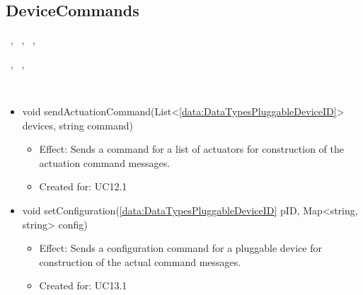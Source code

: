   \subsection{DeviceCommands}\label{int:OnlineServiceOnlineServiceApplicationManagerApplicationManagementLogicDeviceCommands}
    \begin{description}
      \item[Provided by:] \iconcomponent{}~, \iconcomponent{}~, \iconcomponent{}~, \iconcomponent{}~
      \item[Required by:] \iconcomponent{}~, \iconcomponent{}~, \iconcomponent{}~
      \item[Operations:] ~
    \begin{itemize}[noitemsep,nolistsep,leftmargin=-.25cm]
      \item \textsf{void sendActuationCommand(List\textless{}\ref{data:DataTypesPluggableDeviceID}\textgreater{} devices, string command)}
        \begin{itemize}[noitemsep,nolistsep]
           \item Effect: Sends a command for a list of actuators for construction of the actuation command messages.
\item Created for: UC12.1
        \end{itemize}
      \item \textsf{void setConfiguration(\ref{data:DataTypesPluggableDeviceID} pID, Map\textless{}string, string\textgreater{} config)}
        \begin{itemize}[noitemsep,nolistsep]
           \item Effect: Sends a configuration command for a pluggable device for construction of the actual command messages.
\item Created for: UC13.1
        \end{itemize}
    \end{itemize}
    \end{description}

